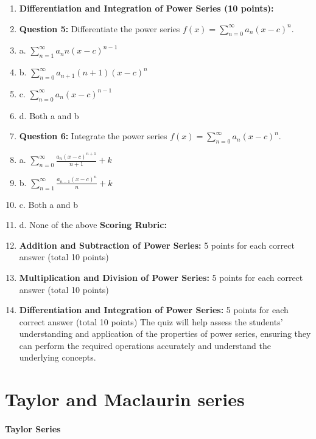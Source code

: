 \begin{enumerate}
    \item \textbf{Differentiation and Integration of Power Series (10 points):}
    \item \textbf{Question 5:} Differentiate the power series \( f(x) = \sum_{n=0}^\infty a_n (x - c)^n \).
    \item a. \( \sum_{n=1}^\infty a_n n (x - c)^{n-1} \)
    \item b. \( \sum_{n=0}^\infty a_{n+1} (n + 1) (x - c)^n \)
    \item c. \( \sum_{n=0}^\infty a_n (x - c)^{n-1} \)
    \item d. Both a and b
    \item \textbf{Question 6:} Integrate the power series \( f(x) = \sum_{n=0}^\infty a_n (x - c)^n \).
    \item a. \( \sum_{n=0}^\infty \frac{a_n (x - c)^{n+1}}{n + 1} + k \)
    \item b. \( \sum_{n=1}^\infty \frac{a_{n-1} (x - c)^n}{n} + k \)
    \item c. Both a and b
    \item d. None of the above \textbf{Scoring Rubric:}
    \item \textbf{Addition and Subtraction of Power Series:} 5 points for each correct answer (total 10 points)
    \item \textbf{Multiplication and Division of Power Series:} 5 points for each correct answer (total 10 points)
    \item \textbf{Differentiation and Integration of Power Series:} 5 points for each correct answer (total 10 points) The quiz will help assess the students' understanding and application of the properties of power series, ensuring they can perform the required operations accurately and understand the underlying concepts.
\end{enumerate}

\section{Taylor and Maclaurin series}
\label{sec:taylor-and-maclaurin-series}

\paragraph{Taylor Series}



